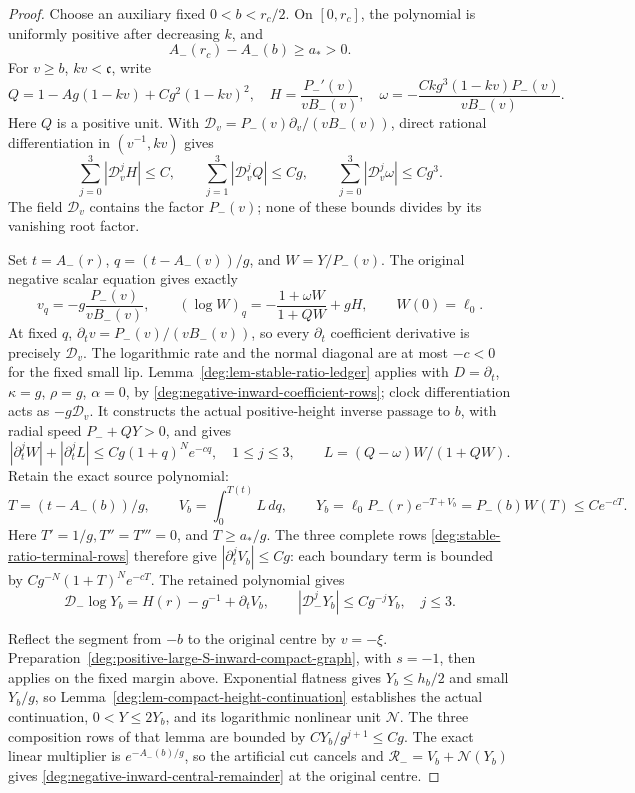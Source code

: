 \begin{proof}
Choose an auxiliary fixed \(0<b<r_c/2\). On \([0,r_c]\), the
polynomial is uniformly positive after decreasing \(k\), and
\[
 A_-(r_c)-A_-(b)\ge a_*>0 .
\]
For \(v\ge b\), \(kv<\mathfrak c\), write
\[
 Q=1-Ag(1-kv)+Cg^2(1-kv)^2,\quad
 H=\frac{P_-'(v)}{vB_-(v)},\quad
 \omega=-\frac{Ckg^3(1-kv)P_-(v)}{vB_-(v)} .
\]
Here \(Q\) is a positive unit. With
\(\mathcal D_v=P_-(v)\partial_v/(vB_-(v))\), direct rational
differentiation in \((v^{-1},kv)\) gives
\begin{equation}\label{deg:negative-inward-coefficient-rows}
 \sum_{j=0}^3|\mathcal D_v^jH|\le C,\qquad
 \sum_{j=1}^3|\mathcal D_v^jQ|\le Cg,\qquad
 \sum_{j=0}^3|\mathcal D_v^j\omega|\le Cg^3 .
\end{equation}
The field \(\mathcal D_v\) contains the factor \(P_-(v)\);
none of these bounds divides by its vanishing root factor.

Set \(t=A_-(r)\), \(q=(t-A_-(v))/g\), and
\(W=Y/P_-(v)\). The original negative scalar equation gives exactly
\[
 v_q=-g\frac{P_-(v)}{vB_-(v)},\qquad
 (\log W)_q=-\frac{1+\omega W}{1+QW}+gH,
 \qquad W(0)=\ell_0 .
\]
At fixed \(q\), \(\partial_t v=P_-(v)/(vB_-(v))\), so every
\(\partial_t\) coefficient derivative is precisely \(\mathcal D_v\).
The logarithmic rate and the normal diagonal are at most \(-c<0\)
for the fixed small lip. Lemma~\ref{deg:lem-stable-ratio-ledger}
applies with \(D=\partial_t\), \(\kappa=g\), \(\rho=g\),
\(\alpha=0\), by \eqref{deg:negative-inward-coefficient-rows};
clock differentiation acts as \(-g\mathcal D_v\). It constructs the
actual positive-height inverse passage to \(b\), with radial speed
\(P_-+QY>0\), and gives
\[
 |\partial_t^jW|+|\partial_t^jL|
 \le Cg(1+q)^Ne^{-cq},\quad1\le j\le3,\qquad
 L=(Q-\omega)W/(1+QW).
\]
Retain the exact source polynomial:
\[
 T=(t-A_-(b))/g,\qquad V_b=\int_0^{T(t)}L\,dq,\qquad
 Y_b=\ell_0P_-(r)e^{-T+V_b}=P_-(b)W(T)\le Ce^{-cT}.
\]
Here \(T'=1/g,T''=T'''=0\), and \(T\ge a_*/g\).
The three complete rows \eqref{deg:stable-ratio-terminal-rows}
therefore give \(|\partial_t^jV_b|\le Cg\): each boundary term
is bounded by \(Cg^{-N}(1+T)^Ne^{-cT}\). The retained polynomial
gives
\[
 \mathcal D_-\log Y_b=H(r)-g^{-1}+\partial_tV_b,
 \qquad |\mathcal D_-^jY_b|\le Cg^{-j}Y_b,\quad j\le3.
\]

Reflect the segment from \(-b\) to the original centre by \(v=-\xi\).
Preparation~\eqref{deg:positive-large-S-inward-compact-graph}, with \(s=-1\),
then applies on the fixed margin above. Exponential flatness gives
\(Y_b\le h_b/2\) and small \(Y_b/g\), so
Lemma~\ref{deg:lem-compact-height-continuation} establishes the actual
continuation, \(0<Y\le2Y_b\), and its logarithmic nonlinear unit
\(\mathcal N\). The three composition rows of that lemma are
bounded by \(CY_b/g^{j+1}\le Cg\).
The exact linear multiplier is \(e^{-A_-(b)/g}\), so the artificial
cut cancels and
\(\mathcal R_-=V_b+\mathcal N(Y_b)\) gives
\eqref{deg:negative-inward-central-remainder} at the original centre.
\end{proof}


